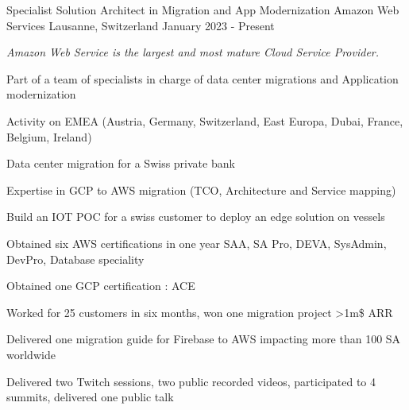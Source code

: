 \clearpage



\begin{cventries}
    \cventry
    {Specialist Solution Architect in Migration and App Modernization} %
    {Amazon Web Services} %
    {Lausanne, Switzerland} %
    {January 2023 - Present} %
    {
        \experience
            {
                \begin{cvitems} %
                    \item{\emph{Amazon Web Service is the largest and most mature Cloud Service Provider.}}
                    \item {Part of a team of specialists in charge of data center migrations and Application modernization }
                    \item {Activity on EMEA (Austria, Germany, Switzerland, East Europa, Dubai, France, Belgium, Ireland) }
                    \end{cvitems}
            }
            {
               \begin{cvitems} %
                \item {Data center migration for a Swiss private bank}
		\item {Expertise in GCP to AWS migration (TCO, Architecture and Service mapping)}
		\item {Build an IOT POC for a swiss customer to deploy an edge solution on vessels}
		\item {Obtained six AWS certifications in one year SAA, SA Pro, DEVA, SysAdmin, DevPro, Database speciality}
		\item {Obtained one GCP certification : ACE}
		\item {Worked for 25 customers in six months, won one migration project >1m\$ ARR}
		\item {Delivered one migration guide for Firebase to AWS impacting more than 100 SA worldwide}
		\item {Delivered two Twitch sessions, two public recorded videos, participated to 4 summits, delivered one public talk}

\end{cvitems}}}
\end{cventries}
